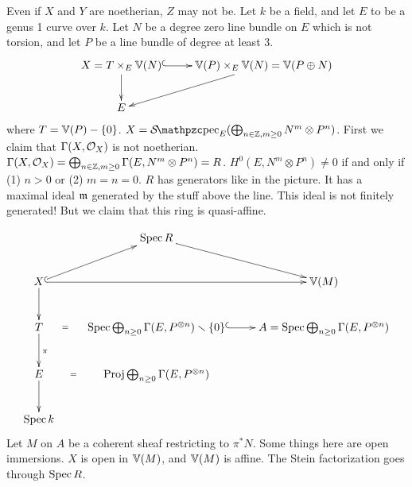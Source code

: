  \begin{warning}
   Even if $X$ and $Y$ are noetherian, $Z$ may not be.
   Let $k$ be a field, and let $E$ to be a genus 1 curve over $k$. Let $N$ be a degree
   zero line bundle on $E$ which is not torsion, and let $P$ be a line bundle of degree
   at least 3.
   \[\xymatrix{
    X = T\times_E \VV(N)\ar[d]\ar@{^(->}[r] & \VV(P)\times_E \VV(N) = \VV(P\oplus N) \ar[dl]
    \\ E
   }\]
    where $T=\mathbb{V}(P)-\{0\}$. $X=\Spec_E (\bigoplus_{n\in \ZZ,m\ge 0}N^m\otimes P^n)$.
   First we claim that $\Gamma(X,\mathcal{O}_X)$ is not noetherian. $\Gamma(X,\mathcal{O}_X) = \bigoplus_{n\in
   \mathbb{Z}, m\ge 0} \Gamma(E,N^m\otimes P^n)=R$. $H^0(E,N^m\otimes P^n)\neq 0$ if and only if
   (1) $n>0$ or (2) $m=n=0$. $R$ has generators like in the picture\anton{}. It has a
   maximal ideal $\mathfrak{m}$ generated by the stuff above the line. This ideal is not finitely
   generated! But we claim that this ring is quasi-affine.

   \[\xymatrix{
   & \spec R \ar[dr]\\
    X\ar[d]\ar[ur] \ar@{^(->}[rr] & & \VV(M)
    \\ T\ar[d]^\pi \ar@{}[r]|<>(.5){=}& \spec \bigoplus_{n\ge 0} \Ga(E,P^{\otimes n}) \setminus
    \{0\} \ar@{^(->}[r] & A=\spec \bigoplus_{n\ge 0} \Ga(E,P^{\otimes n})
    \\ E \ar[d] \ar@{}[r]|<>(.5){=}& \proj\bigoplus_{n\ge 0} \Ga(E,P^{\otimes n})\\
    \spec k
   }\]
   Let $M$ on $A$ be a coherent sheaf restricting to $\pi^* N$. Some things here are open
   immersions. $X$ is open in $\mathbb{V}(M)$, and $\mathbb{V}(M)$ is affine. The Stein factorization
   goes through $\operatorname{Spec} R$.
 \end{warning}
